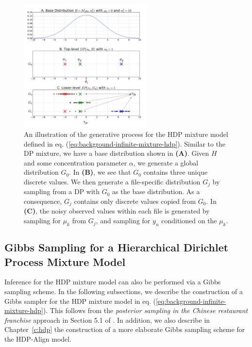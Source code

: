 \begin{figure}
\noindent \begin{centering}
\includegraphics[width=0.6\textwidth]{03-machine-learning/figures/hdp_samples.pdf}
\par\end{centering}
\caption{\label{fig:g-from-hdp}An illustration of the generative process for the HDP mixture model defined in eq. (\ref{eq:background-infinite-mixture-hdp}). Similar to the DP mixture, we have a base distribution shown in \textbf{(A)}. Given $H$ and some concentration parameter $\alpha$, we generate a global distribution $G_0$. In \textbf{(B)}, we see that $G_0$ contains three unique discrete values. We then generate a file-specific distribution $G_j$ by sampling from a DP with $G_0$ as the base distribution. As a consequence, $G_j$ contains only discrete values copied from $G_0$. In \textbf{(C)}, the noisy observed values within each file is generated by sampling for $\mu_k$ from $G_j$, and sampling for $y_n$ conditioned on the $\mu_k$.}
\end{figure}

\subsection{Gibbs Sampling for a Hierarchical Dirichlet Process Mixture Model}

Inference for the HDP mixture model can also be performed via a Gibbs sampling scheme. In the following subsections, we describe the construction of a Gibbs sampler for the HDP mixture model in eq. (\ref{eq:background-infinite-mixture-hdp}). This follows from the \emph{posterior sampling in the Chinese restaurant franchise} approach in Section 5.1 of \cite{teh2005hierarchical}. In addition, we also describe in Chapter~\ref{c:hdp} the construction of a more elaborate Gibbs sampling scheme for the HDP-Align model.

